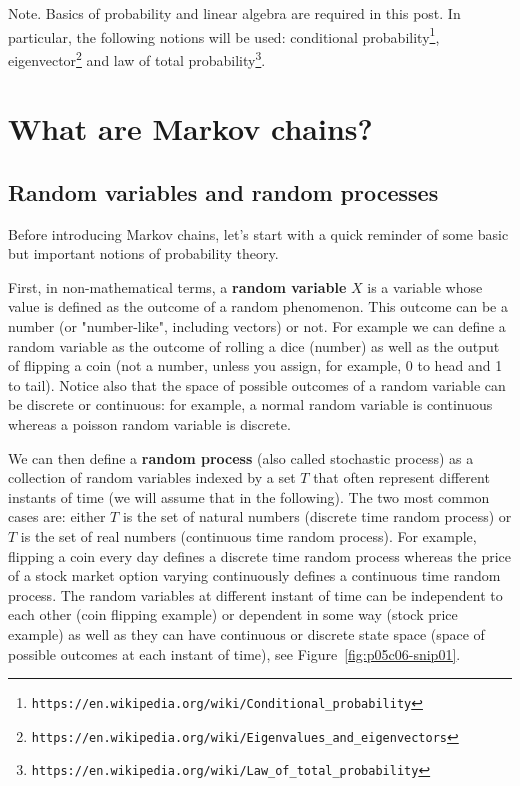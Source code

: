 Note. Basics of probability and linear algebra are required in this post. In particular, the following notions will be used: 
conditional probability\footnote{\lstinline{https://en.wikipedia.org/wiki/Conditional_probability}}, 
eigenvector\footnote{\lstinline{https://en.wikipedia.org/wiki/Eigenvalues_and_eigenvectors}} and 
law of total probability\footnote{\lstinline{https://en.wikipedia.org/wiki/Law_of_total_probability}}.

\section{What are Markov chains?}
\subsection{Random variables and random processes}

Before introducing Markov chains, let's start with a quick reminder of some basic but important notions of probability theory.

First, in non-mathematical terms, a \textbf{random variable} $X$ is a variable whose value is defined as the outcome of a random phenomenon. This outcome can be a number (or "number-like", including vectors) or not. For example we can define a random variable as the outcome of rolling a dice (number) as well as the output of flipping a coin (not a number, unless you assign, for example, 0 to head and 1 to tail). Notice also that the space of possible outcomes of a random variable can be discrete or continuous: for example, a normal random variable is continuous whereas a poisson random variable is discrete.

We can then define a \textbf{random process} (also called stochastic process) as a collection of random variables indexed by a set $T$ that often represent different instants of time (we will assume that in the following). The two most common cases are: either $T$ is the set of natural numbers (discrete time random process) or $T$ is the set of real numbers (continuous time random process). For example, flipping a coin every day defines a discrete time random process whereas the price of a stock market option varying continuously defines a continuous time random process. The random variables at different instant of time can be independent to each other (coin flipping example) or dependent in some way (stock price example) as well as they can have continuous or discrete state space (space of possible outcomes at each instant of time), see Figure~\ref{fig:p05c06-snip01}.

